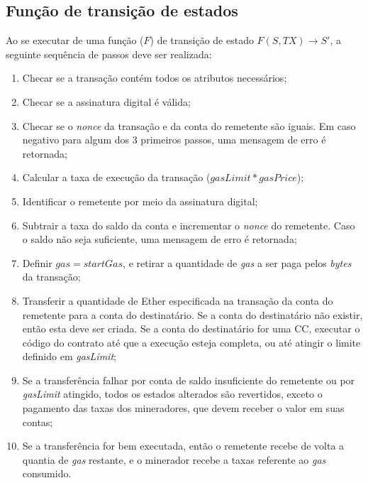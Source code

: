 \subsection{Função de transição de estados} \label{tex:fund:ethereum:transicao}

Ao se executar de uma função ($F$) de transição de estado $F(S, TX) \rightarrow S'$, a seguinte sequência de passos deve ser realizada:
\begin{enumerate}
    \item Checar se a transação contém todos os atributos necessários;
    \item Checar se a assinatura digital é válida; 
    \item Checar se o \textit{nonce} da transação e da conta do remetente são iguais. Em caso negativo para algum dos 3 primeiros passos, uma mensagem de erro é retornada;
    \item Calcular a taxa de execução da transação ($gasLimit * gasPrice$); 
    \item Identificar o remetente por meio da assinatura digital;
    \item Subtrair a taxa do saldo da conta e incrementar o \textit{nonce} do remetente. Caso o saldo não seja suficiente, uma mensagem de erro é retornada;
    \item Definir $gas = startGas$, e retirar a quantidade de \textit{gas} a ser paga pelos \textit{bytes} da transação;
    \item Transferir a quantidade de Ether especificada na transação da conta do remetente para a conta do destinatário. Se a conta do destinatário não existir, então esta deve ser criada. Se a conta do destinatário for uma CC, executar o código do contrato até que a execução esteja completa, ou até atingir o limite definido em \textit{gasLimit};
    \item Se a transferência falhar por conta de saldo insuficiente do remetente ou por \textit{gasLimit} atingido, todos os estados alterados são revertidos, exceto o pagamento das taxas dos mineradores, que devem receber o valor em suas contas;
    \item Se a transferência for bem executada, então o remetente recebe de volta a quantia de \textit{gas} restante, e o minerador recebe a taxas referente ao \textit{gas} consumido.
\end{enumerate}